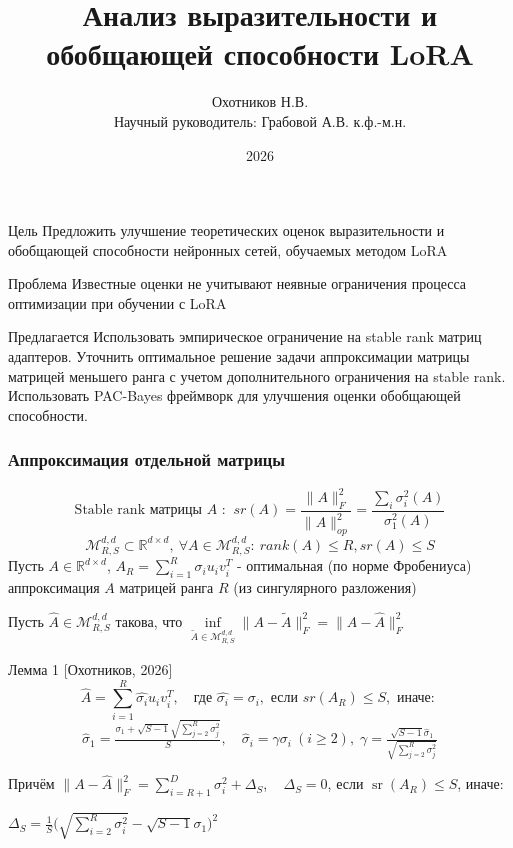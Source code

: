 \documentclass[10pt]{beamer}
\title[]{Анализ выразительности и обобщающей способности LoRA}
\author{Охотников Н.В.\\ Научный руководитель: Грабовой А.В. к.ф.-м.н.}
\institute{МФТИ}
\date{2026}
\DeclareMathOperator{\sr}{sr}
\begin{document}
\begin{frame}
  \titlepage{}
\end{frame}


\begin{frame}
    \vfill
    \begin{block}{Цель}
        Предложить улучшение теоретических оценок выразительности и обобщающей способности нейронных сетей, обучаемых методом LoRA 
    \end{block}
    \vfill
    \begin{block}{Проблема}
        Известные оценки не учитывают неявные ограничения процесса оптимизации при обучении с LoRA
    \end{block}
    \vfill
    \begin{block}{Предлагается}
        Использовать эмпирическое ограничение на stable rank матриц адаптеров. Уточнить оптимальное решение задачи аппроксимации матрицы матрицей меньшего ранга с учетом дополнительного ограничения на stable rank.
        Использовать PAC-Bayes фреймворк для улучшения оценки обобщающей способности.
    \end{block}
\end{frame}


\begin{frame}
    \frametitle{Аппроксимация отдельной матрицы}
    \vspace{-0.8cm}
    $$\text{Stable rank матрицы } A \text{ : } ~ sr(A) = \frac{\|A\|_F^2}{\|A\|_{op}^2} = \frac{\sum_i \sigma_i^2(A)}{\sigma_1^2(A)}$$
    $$\mathcal{M}_{R,S}^{d,d} \subset \mathbb{R}^{d\times d},~ \forall A \in\mathcal{M}_{R,S}^{d,d}:~ rank(A) \leqslant R, sr(A) \leqslant S$$
    Пусть $A\in \mathbb{R}^{d\times d}$, $A_R = \sum_{i=1}^R \sigma_i u_i v_i^T$ - оптимальная (по норме Фробениуса) аппроксимация $A$ матрицей ранга $R$ (из сингулярного разложения)

    Пусть $\hat{A} \in \mathcal{M}_{R,S}^{d,d}$ такова, что  $\inf\limits_{\tilde{A}\in \mathcal{M}_{R,S}^{d,d}}\|A - \tilde{A}\|_F^2 = \|A - \hat{A}\|_F^2$

    \begin{block}{Лемма 1 [Охотников, 2026]}
        \vspace{-0.5cm}
        $$\hat{A} = \sum_{i=1}^R \hat{\sigma_i} u_i v_i^T, \quad \text{где }\hat{\sigma_i} = \sigma_i, \text{ если }sr(A_R) \leqslant S, \text{ иначе: }$$
        \vspace{-0.3cm}
        $$\hat{\sigma}_1 = \tfrac{\sigma_1 + \sqrt{S-1}\sqrt{\sum_{j=2}^R\sigma_j^2}}{S},\quad \hat{\sigma}_i = \gamma \sigma_i ~ (i \geqslant 2), \;\gamma = \tfrac{\sqrt{S-1}\hat{\sigma}_1}{\sqrt{\sum_{j=2}^R\sigma_j^2}}$$
        
        Причём $\|A - \hat{A}\|_F^2 = \sum_{i=R+1}^{D}\sigma_i^2 + \Delta_S$, ~ $\Delta_S = 0$, если $\sr(A_R) \leqslant S$, иначе:

        \hspace{3cm} $\Delta_S = \frac{1}{S}\big(\sqrt{\sum_{i=2}^R\sigma_i^2} - \sqrt{S-1}\sigma_1\big)^2$
    \end{block}
\end{frame}
\end{document}

